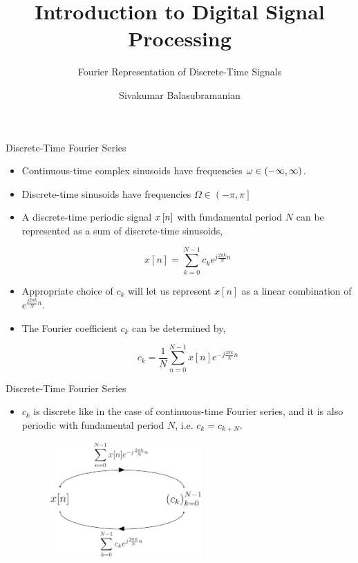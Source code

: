 \documentclass[aspectratio=169]{beamer}
\title{Introduction to Digital Signal Processing}
\subtitle{Fourier Representation of Discrete-Time Signals}
\author{Sivakumar Balasubramanian}
\institute[Christian Medical College] %
{
  \inst{}%
  Department of Bioengineering\\
  Christian Medical College, Bagayam\\
  Vellore 632002
}
\date{}
\let\olditem\item
\renewcommand{\item}{\setlength{\itemsep}{\fill}\olditem}
\def\lp{\ensuremath\left(}
\def\rp{\ensuremath\right)}
\def\ls{\ensuremath\left[}
\def\rs{\ensuremath\right]}
\begin{document}
\begin{frame}
  \titlepage
\end{frame}


\begin{frame}[t]{Discrete-Time Fourier Series}
\begin{itemize}
  \item Continuous-time complex sinusoids have frequencies $\omega \in \lp -\infty, \infty \rp$.

  \item Discrete-time sinusoids have frequencies $\Omega \in \left( -\pi, \pi\right]$

  \item A discrete-time periodic signal $x\ls n \rs$ with fundamental period $N$ can be represented as a sum of discrete-time sinusoids,

  \[ x[n] = \sum_{k=0}^{N-1} c_k e^{j \frac{2\pi k}{N}n} \]

  \item Appropriate choice of $c_k$ will let us represent $x[n]$ as a linear combination of $e^{\frac{j2\pi k}{N}n}$.

  \item The Fourier coefficient $c_k$ can be determined by,

  \[ c_k = \frac{1}{N} \sum_{n=0}^{N-1} x[n] e^{-j\frac{2 \pi k}{N} n} \]
\end{itemize}
\end{frame}


\begin{frame}[t]{Discrete-Time Fourier Series}
\begin{itemize}
  \item $c_k$ is discrete like in the case of continuous-time Fourier series, and it is also periodic with fundamental period $N$, i.e. $c_k = c_{k + N}$.
  \begin{figure}
  \includegraphics[width=0.55\textwidth]{img/dtfs.png}
  \end{figure}
\end{itemize}
\end{frame}
\end{document}
